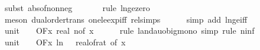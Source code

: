 \begin{isabellebody}
\ {\isacharparenleft}{\kern0pt}subst\ abs{\isacharunderscore}{\kern0pt}of{\isacharunderscore}{\kern0pt}nonneg{\isacharparenright}{\kern0pt}\isanewline
\ \ \ \ \ \isamarkupfalse%
\ {\isacharparenleft}{\kern0pt}rule\ ln{\isacharunderscore}{\kern0pt}ge{\isacharunderscore}{\kern0pt}zero{\isacharparenright}{\kern0pt}\isanewline
\ \ \ \ \isamarkupfalse%
\ {\isacharparenleft}{\kern0pt}meson\ dual{\isacharunderscore}{\kern0pt}order{\isachardot}{\kern0pt}trans\ one{\isacharunderscore}{\kern0pt}le{\isacharunderscore}{\kern0pt}exp{\isacharunderscore}{\kern0pt}iff\ rel{\isacharunderscore}{\kern0pt}simps{\isacharparenleft}{\kern0pt}{}{}{\isacharparenright}{\kern0pt}{\isacharparenright}{\kern0pt}\isanewline
\ \ \ \ \isamarkupfalse%
\ {\isacharparenleft}{\kern0pt}simp\ add{\isacharcolon}{\kern0pt}\ ln{\isacharunderscore}{\kern0pt}ge{\isacharunderscore}{\kern0pt}iff{\isacharparenright}{\kern0pt}\isanewline
\isanewline
\ \ \isamarkupfalse%
\ unit{\isacharunderscore}{\kern0pt}{}{\isacharcolon}{\kern0pt}\ {\isachardoublequoteopen}{\isacharparenleft}{\kern0pt}{\isasymlambda}{\isacharunderscore}{\kern0pt}{\isachardot}{\kern0pt}\ {}{\isacharparenright}{\kern0pt}\ {\isasymin}\ O{\isacharbrackleft}{\kern0pt}{\isacharquery}{\kern0pt}F{\isacharbrackright}{\kern0pt}{\isacharparenleft}{\kern0pt}{\isasymlambda}x{\isachardot}{\kern0pt}\ real\ {\isacharparenleft}{\kern0pt}n{\isacharunderscore}{\kern0pt}of\ x{\isacharparenright}{\kern0pt}{\isacharparenright}{\kern0pt}{\isachardoublequoteclose}\isanewline
\ \ \ \ \isamarkupfalse%
\ {\isacharparenleft}{\kern0pt}rule\ landau{\isacharunderscore}{\kern0pt}o{\isachardot}{\kern0pt}big{\isacharunderscore}{\kern0pt}mono{\isacharcomma}{\kern0pt}\ simp{\isacharcomma}{\kern0pt}\ rule\ n{\isacharunderscore}{\kern0pt}inf{\isacharparenright}{\kern0pt}\isanewline
\isanewline
\ \ \isamarkupfalse%
\ unit{\isacharunderscore}{\kern0pt}{}{\isacharcolon}{\kern0pt}\ {\isachardoublequoteopen}{\isacharparenleft}{\kern0pt}{\isasymlambda}{\isacharunderscore}{\kern0pt}{\isachardot}{\kern0pt}\ {}{\isacharparenright}{\kern0pt}\ {\isasymin}\ O{\isacharbrackleft}{\kern0pt}{\isacharquery}{\kern0pt}F{\isacharbrackright}{\kern0pt}{\isacharparenleft}{\kern0pt}{\isasymlambda}x{\isachardot}{\kern0pt}\ ln\ {\isacharparenleft}{\kern0pt}{}\ {\isacharslash}{\kern0pt}\ real{\isacharunderscore}{\kern0pt}of{\isacharunderscore}{\kern0pt}rat\ {\isacharparenleft}{\kern0pt}{\isasymepsilon}{\isacharunderscore}{\kern0pt}of\ x{\isacharparenright}{\kern0pt}{\isacharparenright}{\kern0pt}{\isacharparenright}{\kern0pt}{\isachardoublequoteclose}\isanewline

\end{isabellebody}
